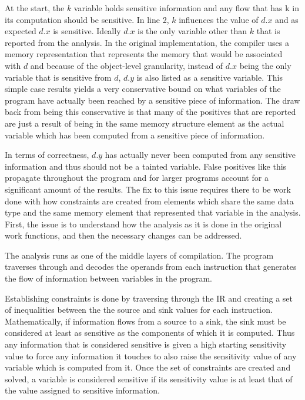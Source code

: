 \documentclass[11pt,a4paper]{article}
\begin{document}
  At the start, the $k$ variable holds sensitive information and any flow that has k
  in its computation should be sensitive. In line 2, $k$ influences the value of $d.x$
  and as expected $d.x$ is sensitive. Ideally $d.x$ is the only variable other
  than $k$ that is reported from the analysis. In the original implementation,
  the compiler uses a memory representation that represents the memory that would
  be associated with $d$ and because of the object-level granularity, instead of
  $d.x$ being the only variable that is sensitive from $d$, $d.y$ is also listed
  as a sensitive variable. This simple case results yields a very conservative
  bound on what variables of the program have actually been reached by a sensitive
  piece of information. The draw back from being this conservative is that many of
  the positives that are reported are just a result of being in the same memory
  structure element as the actual variable which has been computed from a
  sensitive piece of information.

  In terms of correctness, $d.y$ has actually never been computed from any
  sensitive information and thus should not be a tainted variable. False
  positives like this propagate throughout the program and for larger programs
  account for a significant amount of the results. The fix to this issue
  requires there to be work done with how constraints are created from elements
  which share the same data type and the same memory element that represented
  that variable in the analysis. First, the issue is to understand how the
  analysis as it is done in the original work functions, and then the necessary
  changes can be addressed.

  The analysis runs as one of the middle layers of compilation. The program
  traverses through and decodes the operands from each instruction that
  generates the flow of information between variables in the program.

  Establishing constraints is done by traversing through the IR and creating a
  set of inequalities between the the source and sink values for each
  instruction. Mathematically, if information flows from a source to a sink, the
  sink must be considered at least as sensitive as the components of which it is
  computed. Thus any information that is considered sensitive is given a high
  starting sensitivity value to force any information it touches to also raise
  the sensitivity value of any variable which is computed from it. Once the set
  of constraints are created and solved, a variable is considered sensitive if
  its sensitivity value is at least that of the value assigned to sensitive
  information.
\end{document}
